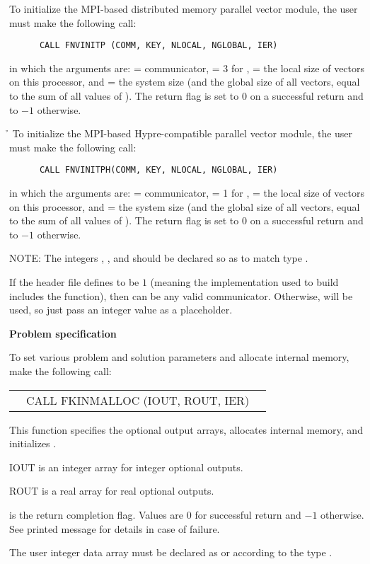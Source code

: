 \begin{Steps}
  {\p} To initialize the MPI-based distributed memory 
  parallel vector module, the user must make the following call:
\begin{verbatim}
      CALL FNVINITP (COMM, KEY, NLOCAL, NGLOBAL, IER)
\end{verbatim}
  in which the arguments are:
   = {\mpi} communicator,
   = 3 for {\kinsol},
   = the local size of
  vectors on this processor, and  = the system size (and the global
  size of all vectors, equal to the sum of all values of ).
  The return flag  is set to $0$ on a successful return and to $-1$
  otherwise.

  {\h} To initialize the MPI-based Hypre-compatible parallel vector
  module, the user must make the following call:
\begin{verbatim}
      CALL FNVINITPH(COMM, KEY, NLOCAL, NGLOBAL, IER)
\end{verbatim}
  in which the arguments are:  = {\mpi} communicator,
   = 1 for {\cvode},  = the local size of
  vectors on this processor, and  = the system size (and the global
  size of all vectors, equal to the sum of all values of ).
  The return flag  is set to $0$ on a successful return and to $-1$
  otherwise.

  NOTE: The integers , , and  should be
  declared so as to match {\C} type .

  {\warn}If the header file  defines
   to be $1$ (meaning the {\mpi}
  implementation used to build {\sundials} includes the
   function), then  can be any valid
  {\mpi} communicator. Otherwise,  will be used, so
  just pass an integer value as a placeholder.

\item {\bf Problem specification}

  To set various problem and solution parameters and allocate
  internal memory, make the following call:
  {
    \begin{tabular}[t]{@{}r@{}l@{}l@{}}
        &CALL FKINMALLOC (IOUT, ROUT, IER)
    \end{tabular}
  }
  {
    This function specifies the optional output arrays,
    allocates internal memory, and initializes {\kinsol}.
  }
  {
    \begin{args}[IOUT\,]
    \item[IOUT] is an integer array for integer optional outputs.
    \item[ROUT] is a real array for real optional outputs.
    \end{args}
  }
  {
     is the return completion flag. Values are $0$ for successful return
    and $-1$ otherwise. See printed message for details in case of failure.
  }
  {
    The user integer data array  must be declared as  or
     according to the {\C} type .

}
\end{Steps}
